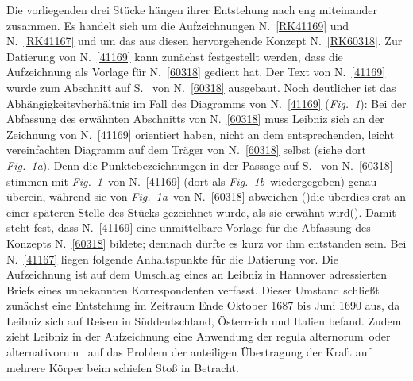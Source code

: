 %  
%
%							
%
%
\frenchspacing
%
\vspace{5mm}
\begin{ledgroup}
\footnotesize%
\pstart
\noindent%
Die vorliegenden drei Stücke hängen ihrer Entstehung nach eng miteinander zusammen. Es handelt sich um die Aufzeichnungen N.~\ref{RK41169} und N.~\ref{RK41167} und um das aus diesen hervorgehende Konzept N.~\ref{RK60318}.
\pend
%
\pstart
%
Zur Datierung von N.~\ref{41169} kann zunächst festgestellt werden, dass die Aufzeichnung als Vorlage für N.~\ref{60318} gedient hat.
%
Der Text von N.~\ref{41169} wurde zum Abschnitt auf S.~  von N.~\ref{60318} ausgebaut.
%
Noch deutlicher ist das Abhängigkeitsvherhältnis im Fall des Diagramms von N.~\ref{41169} (\lbrack\textit{Fig.~1}\rbrack):
%
Bei der Abfassung des erwähnten Abschnitts von N.~\ref{60318} muss Leibniz sich an der Zeichnung von N.~\ref{41169}
%
orientiert haben, nicht an dem entsprechenden, leicht vereinfachten
%
Diagramm auf dem Träger von N.~\ref{60318} selbst (siehe dort \lbrack\textit{Fig.~1a}\rbrack). 
%
Denn die Punktebezeichnungen in der Passage auf S.~  von N.~\ref{60318} 
%
stimmen mit \lbrack\textit{Fig.~1}\rbrack\ von N.~\ref{41169} (dort als \lbrack\textit{Fig.~1b}\rbrack\ wiedergegeben) genau überein, 
%
während sie von \lbrack\textit{Fig.~1a}\rbrack\ von N.~\ref{60318} abweichen 
%
(\protect\vphantom)die überdies erst an einer späteren Stelle des Stücks gezeichnet wurde, als sie erwähnt wird\protect\vphantom().
%
Damit steht fest, dass N.~\ref{41169} eine unmittelbare Vorlage für die Abfassung des Konzepts N.~\ref{60318} bildete; demnach
%
dürfte es kurz vor ihm entstanden sein.
%
\pend
%
\pstart
%
Bei N.~\ref{41167} liegen folgende Anhaltspunkte für die Datierung vor.
%
Die Aufzeichnung ist auf dem Umschlag eines 
%
an Leibniz in Hannover\protect{} adressierten
%
Briefs eines unbekannten Korrespondenten verfasst.
%
Dieser Umstand schließt zunächst eine Entstehung im Zeitraum Ende Oktober 1687 bis Juni 1690 aus,
%
da Leibniz sich auf Reisen in Süddeutschland, Österreich und Italien befand.
%
Zudem zieht Leibniz in der Aufzeichnung eine Anwendung der \glqq regula alternorum\grqq\ oder \glqq alternativorum\grqq\ 
%
auf das Problem der anteiligen Übertragung der Kraft auf mehrere Körper beim schiefen Stoß in Betracht.

\end{ledgroup}
